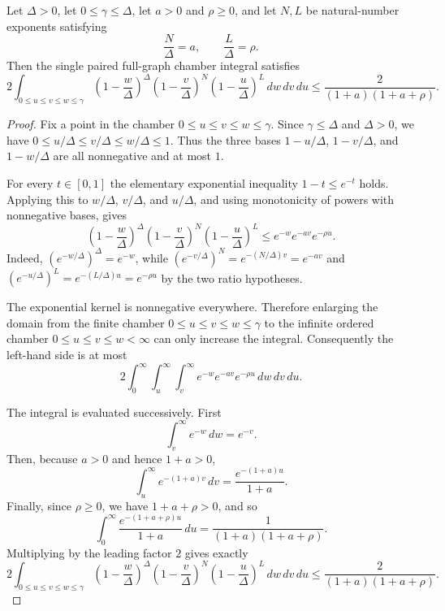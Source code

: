 \begin{helper}
Let $\Delta>0$, let $0\le\gamma\le\Delta$, let $a>0$ and $\rho\ge0$, and
let $N,L$ be natural-number exponents satisfying
\[
\frac N\Delta=a,\qquad \frac L\Delta=\rho .
\]
Then the single paired full-graph chamber integral satisfies
\[
2\int_{0\le u\le v\le w\le\gamma}
\left(1-\frac w\Delta\right)^\Delta
\left(1-\frac v\Delta\right)^N
\left(1-\frac u\Delta\right)^L\,dw\,dv\,du
\le
\frac{2}{(1+a)(1+a+\rho)}.
\]
\end{helper}
\begin{proof}
Fix a point in the chamber $0\le u\le v\le w\le\gamma$.  Since
$\gamma\le\Delta$ and $\Delta>0$, we have
$0\le u/\Delta\le v/\Delta\le w/\Delta\le1$.  Thus the three bases
$1-u/\Delta$, $1-v/\Delta$, and $1-w/\Delta$ are all nonnegative and at most
$1$.

For every $t\in[0,1]$ the elementary exponential inequality
$1-t\le e^{-t}$ holds.  Applying this to $w/\Delta$, $v/\Delta$, and
$u/\Delta$, and using monotonicity of powers with nonnegative bases, gives
\[
\left(1-\frac w\Delta\right)^\Delta
\left(1-\frac v\Delta\right)^N
\left(1-\frac u\Delta\right)^L
\le
e^{-w}e^{-av}e^{-\rho u}.
\]
Indeed,
$(e^{-w/\Delta})^\Delta=e^{-w}$, while
$(e^{-v/\Delta})^N=e^{-(N/\Delta)v}=e^{-av}$ and
$(e^{-u/\Delta})^L=e^{-(L/\Delta)u}=e^{-\rho u}$ by the two ratio
hypotheses.

The exponential kernel is nonnegative everywhere.  Therefore enlarging the
domain from the finite chamber $0\le u\le v\le w\le\gamma$ to the infinite
ordered chamber $0\le u\le v\le w<\infty$ can only increase the integral.
Consequently the left-hand side is at most
\[
2\int_0^\infty\int_u^\infty\int_v^\infty
e^{-w}e^{-av}e^{-\rho u}\,dw\,dv\,du .
\]

The integral is evaluated successively.  First
\[
\int_v^\infty e^{-w}\,dw=e^{-v}.
\]
Then, because $a>0$ and hence $1+a>0$,
\[
\int_u^\infty e^{-(1+a)v}\,dv
=\frac{e^{-(1+a)u}}{1+a}.
\]
Finally, since $\rho\ge0$, we have $1+a+\rho>0$, and so
\[
\int_0^\infty \frac{e^{-(1+a+\rho)u}}{1+a}\,du
=\frac{1}{(1+a)(1+a+\rho)}.
\]
Multiplying by the leading factor $2$ gives exactly
\[
2\int_{0\le u\le v\le w\le\gamma}
\left(1-\frac w\Delta\right)^\Delta
\left(1-\frac v\Delta\right)^N
\left(1-\frac u\Delta\right)^L\,dw\,dv\,du
\le
\frac{2}{(1+a)(1+a+\rho)}.
\]
\end{proof}
